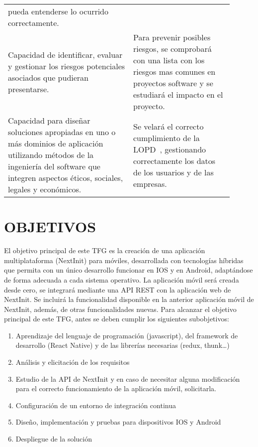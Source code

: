 \documentclass{pre-tfg}
\begin{document}
\begin{table}[hp]
\begin{tabular}{p{0.5\linewidth}p{0.4\linewidth}}
            pueda entenderse lo ocurrido correctamente. \\
            Capacidad de identificar, evaluar y gestionar los riesgos potenciales asociados que pudieran presentarse.
            & Para prevenir posibles riesgos, se comprobará con una lista con los riesgos mas comunes en proyectos
            software y se estudiará el impacto en el proyecto. \\
            Capacidad para diseñar soluciones apropiadas en uno o más dominios de aplicación utilizando métodos
            de la ingeniería del software que integren aspectos éticos, sociales, legales y económicos.
            & Se velará el correcto cumplimiento de la LOPD~\cite{LOPD}, gestionando correctamente los datos de los
            usuarios y de las empresas.\\
            \hline
        \end{tabular}
    \end{table}


    \section{OBJETIVOS}

    El objetivo principal de este TFG es la creación de una aplicación multiplataforma (NextInit) para móviles,
    desarrollada con tecnologías híbridas que permita con un único desarrollo funcionar en IOS y en Android,
    adaptándose de forma adecuada a cada sistema operativo. La aplicación móvil será creada desde cero, se
    integrará mediante una API REST con la aplicación web de NextInit. Se incluirá la funcionalidad disponible
    en la anterior aplicación móvil de NextInit, además, de otras funcionalidades nuevas.
    \newline\newline
    Para alcanzar el objetivo principal de este TFG, antes se deben cumplir los siguientes subobjetivos:
    \begin{enumerate}
        \item Aprendizaje del lenguaje de programación (javascript), del framework de desarrollo (React Native)
        y de las librerías necesarias (redux, thunk…)
        \item Análisis y elicitación de los requisitos
        \item Estudio de la API de NextInit y en caso de necesitar alguna modificación para el correcto
        funcionamiento de la aplicación móvil, solicitarla.
        \item Configuración de un entorno de integración continua
        \item Diseño, implementación y pruebas para dispositivos IOS y Android
        \item Despliegue de la solución
    \end{enumerate}
\end{document}
